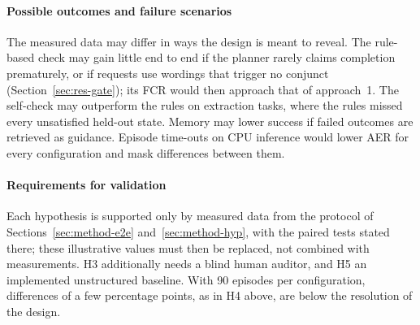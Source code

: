 \paragraph{Possible outcomes and failure scenarios} The measured data may differ in ways the design is meant to reveal. The rule-based check may gain little end to end if the planner rarely claims completion prematurely, or if requests use wordings that trigger no conjunct (Section~\ref{sec:res-gate}); its FCR would then approach that of approach~1. The self-check may outperform the rules on extraction tasks, where the rules missed every unsatisfied held-out state. Memory may lower success if failed outcomes are retrieved as guidance. Episode time-outs on CPU inference would lower AER for every configuration and mask differences between them.

\paragraph{Requirements for validation} Each hypothesis is supported only by measured data from the protocol of Sections~\ref{sec:method-e2e} and~\ref{sec:method-hyp}, with the paired tests stated there; these illustrative values must then be replaced, not combined with measurements. H3 additionally needs a blind human auditor, and H5 an implemented unstructured baseline. With 90 episodes per configuration, differences of a few percentage points, as in H4 above, are below the resolution of the design.
